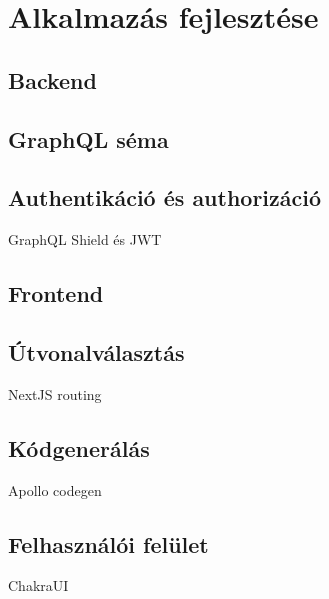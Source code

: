 
\chapter{Alkalmazás fejlesztése}

\section{Backend}


\section{GraphQL séma}

\section{Authentikáció és authorizáció}
GraphQL Shield és JWT


\section{Frontend}

\section{Útvonalválasztás}
NextJS routing

\section{Kódgenerálás}
Apollo codegen

\section{Felhasználói felület}
ChakraUI
